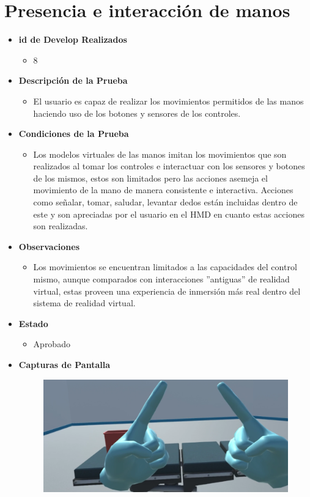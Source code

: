 \section{Presencia e interacción de manos}
\begin{itemize}
    \item \textbf{id de Develop Realizados}
    \begin{itemize}
        \item 8
    \end{itemize}
    \item \textbf{Descripción de la Prueba}
    \begin{itemize}
        \item El usuario es capaz de realizar los movimientos permitidos de las manos haciendo uso de los botones y sensores de los controles. 
    \end{itemize}
    \item \textbf{Condiciones de la Prueba}
    \begin{itemize}
        \item Los modelos virtuales de las manos imitan los movimientos que son realizados al tomar los controles e interactuar con los sensores y botones de los mismos, estos son limitados pero las acciones asemeja el movimiento de la mano de manera consistente e interactiva. Acciones como señalar, tomar, saludar, levantar dedos están incluidas dentro de este y son apreciadas por el usuario en el HMD en cuanto estas acciones son realizadas.
    \end{itemize}
    \item \textbf{Observaciones}
    \begin{itemize}
        \item Los movimientos se encuentran limitados a las capacidades del control mismo, aunque comparados con interacciones ”antiguas” de realidad virtual, estas proveen una experiencia de inmersión más real dentro del sistema de realidad virtual.
    \end{itemize}
    \item \textbf{Estado}
    \begin{itemize}
        \item Aprobado
    \end{itemize}
    \item \textbf{Capturas de Pantalla}
    \begin{figure}[H]
       	\begin{center}
       		\includegraphics[width = .7\textwidth]{source/images/image32.png}

\end{center}
\end{figure}
\end{itemize}
